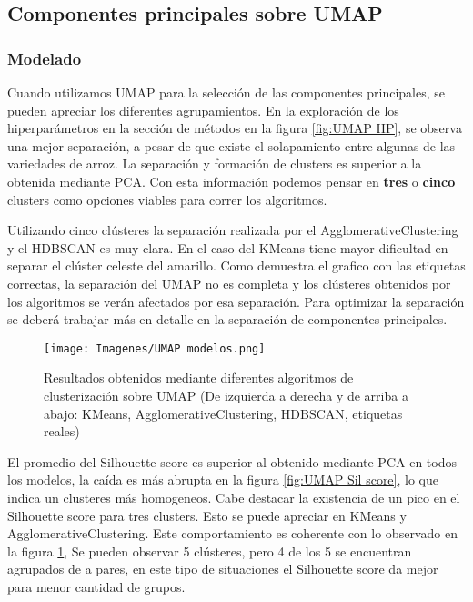 \documentclass{article}
\begin{document}
\subsection{Componentes principales sobre UMAP}
\subsubsection{Modelado}

Cuando utilizamos UMAP para la selección de las componentes principales, se pueden apreciar los diferentes agrupamientos. En la exploración de los hiperparámetros en la sección de métodos en la figura \ref{fig:UMAP HP}, se observa una mejor separación, a pesar de que existe el solapamiento entre algunas de las variedades de arroz. La separación y formación de clusters es superior a la obtenida mediante PCA.
Con esta información podemos pensar en \textbf{tres} o \textbf{cinco} clusters como opciones viables para correr los algoritmos.

Utilizando cinco clústeres la separación realizada por el AgglomerativeClustering y el HDBSCAN es muy clara. En el caso del KMeans tiene mayor dificultad en separar el clúster celeste del amarillo. Como demuestra el grafico con las etiquetas correctas, la separación del UMAP no es completa y los clústeres obtenidos por los algoritmos se verán afectados por esa separación. Para optimizar la separación se deberá trabajar más en detalle en la separación de componentes principales.
\clearpage
\begin{figure}[!htb]
    \centering
    \texttt{[image: Imagenes/UMAP modelos.png]}
    \caption{Resultados obtenidos mediante diferentes algoritmos de clusterización sobre UMAP (De izquierda a derecha y de arriba a abajo: KMeans, AgglomerativeClustering, HDBSCAN, etiquetas reales)}
    \label{fig:UMAP modelos}
\end{figure}

El promedio del Silhouette score es superior al obtenido mediante PCA en todos los modelos, la caída es más abrupta en la figura \ref{fig:UMAP Sil score}, lo que indica un clusteres más homogeneos.
Cabe destacar la existencia de un pico en el Silhouette score para tres clusters. Esto se puede apreciar en KMeans y AgglomerativeClustering. Este comportamiento es coherente con lo observado en la figura \ref{fig:UMAP modelos}, Se pueden observar 5 clústeres, pero 4 de los 5 se encuentran agrupados de a pares, en este tipo de situaciones el Silhouette score da mejor para menor cantidad de grupos.
\end{document}
